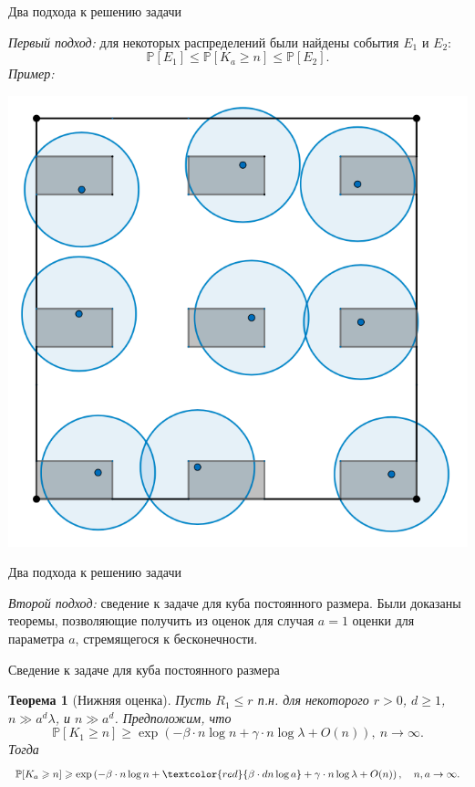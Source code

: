 \documentclass[aspectratio=1610]{beamer}
\theoremstyle{plain}
\newtheorem{thm}{Теорема} %
\theoremstyle{definition}
\theoremstyle{remark}
\def\geq{\geqslant}
\def\leq{\leqslant}
\newcommand{\PP}{\mathbb{P}}
\begin{document}
\begin{frame}{Два подхода к решению задачи}

{\it Первый подход:} для некоторых распределений были найдены события $E_1$ и $E_2$:
$$\PP[E_1] \leq \PP[K_a \geq n] \leq \PP[E_2].$$
{\it Пример:}
\begin{center}
 \includegraphics[scale = 0.3]{pic2.png}   
\end{center}



\end{frame}
\begin{frame}{Два подхода к решению задачи}

{\it Второй подход:} сведение к задаче для куба постоянного размера. Были доказаны теоремы, позволяющие получить из оценок для случая $a=1$ оценки для параметра $a$, стремящегося к бесконечности.
    
\end{frame}

\begin{frame}{Сведение к задаче для куба постоянного размера}

\begin{thm}[Нижняя оценка]
    Пусть $R_1\leq r$ п.н. для некоторого $r>0$, $d\geq 1$, $n \gg a^d\lambda$, и $n\gg a^d$. 
Предположим, что 
\begin{equation*}
    \PP[K_1 \geq n] \geq \exp \left(-\beta\cdot n\log n + \gamma\cdot n\log\lambda + O(n)\right),\  n \to \infty.
 \end{equation*}{}
Тогда 
\begin{equation*}
    \PP[K_a \geq n] \geq \exp \left(-\beta\cdot n\log n + \textcolor{red}{\beta\cdot dn\log a} + \gamma\cdot n\log\lambda + O(n)\right),\quad  n, a \to \infty.
\end{equation*}{}
\end{thm}
    
\end{frame}
\end{document}
